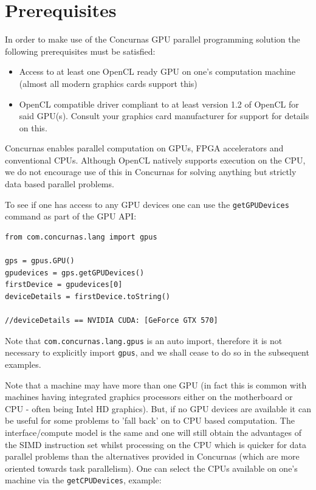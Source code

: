 \documentclass[conc-doc]{subfiles}
\begin{document}
\section{Prerequisites}
In order to make use of the Concurnas GPU parallel programming solution the following prerequisites must be satisfied:

\begin{itemize}
	\item Access to at least one OpenCL ready GPU on one's computation machine (almost all modern graphics cards support this)
	\item OpenCL compatible driver compliant to at least version 1.2 of OpenCL for said GPU(s). Consult your graphics card manufacturer for support for details on this.
\end{itemize}


Concurnas enables parallel computation on GPUs, FPGA accelerators and conventional CPUs. Although OpenCL natively supports execution on the CPU, we do not encourage use of this in Concurnas for solving anything but strictly data based parallel problems.

To see if one has access to any GPU devices one can use the \lstinline{getGPUDevices} command as part of the GPU API:

\begin{lstlisting}
from com.concurnas.lang import gpus

gps = gpus.GPU()
gpudevices = gps.getGPUDevices()
firstDevice = gpudevices[0]
deviceDetails = firstDevice.toString()

//deviceDetails == NVIDIA CUDA: [GeForce GTX 570]
\end{lstlisting}

Note that \lstinline{com.concurnas.lang.gpus} is an auto import, therefore it is not necessary to explicitly import \lstinline{gpus}, and we shall cease to do so in the subsequent examples.

Note that a machine may have more than one GPU (in fact this is common with machines having integrated graphics processors either on the motherboard or CPU - often being Intel HD graphics). But, if no GPU devices are available it can be useful for some problems to 'fall back' on to CPU based computation. The interface/compute model is the same and one will still obtain the advantages of the SIMD instruction set whilst processing on the CPU which is quicker for data parallel problems than the alternatives provided in Concurnas (which are more oriented towards task parallelism). One can select the CPUs available on one's machine via the \lstinline{getCPUDevices}, example:
\end{document}
